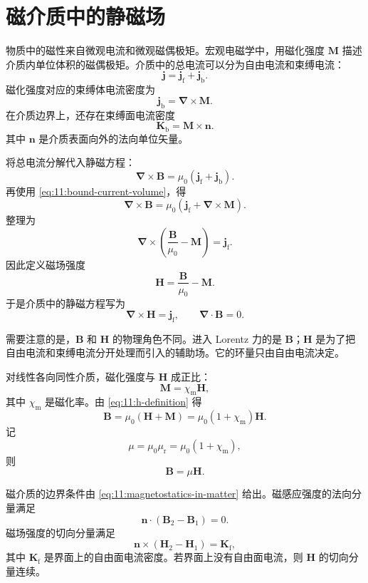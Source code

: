 \section{磁介质中的静磁场}

物质中的磁性来自微观电流和微观磁偶极矩。宏观电磁学中，用磁化强度 $\bm{M}$ 描述介质内单位体积的磁偶极矩。介质中的总电流可以分为自由电流和束缚电流：
\[
\bm{j}
=
\bm{j}_{\mathrm{f}}
+
\bm{j}_{\mathrm{b}}.
\]
磁化强度对应的束缚体电流密度为
\begin{equation}
	\bm{j}_{\mathrm{b}}
	=
	\bm{\nabla}\times\bm{M}.
	\label{eq:11:bound-current-volume}
\end{equation}
在介质边界上，还存在束缚面电流密度
\begin{equation}
	\bm{K}_{\mathrm{b}}
	=
	\bm{M}\times\bm{n}.
	\label{eq:11:bound-current-surface}
\end{equation}
其中 $\bm{n}$ 是介质表面向外的法向单位矢量。

将总电流分解代入静磁方程：
\[
\bm{\nabla}\times\bm{B}
=
\mu_{0}
(\bm{j}_{\mathrm{f}}+\bm{j}_{\mathrm{b}}).
\]
再使用 \eqref{eq:11:bound-current-volume}，得
\[
\bm{\nabla}\times\bm{B}
=
\mu_{0}
(\bm{j}_{\mathrm{f}}+\bm{\nabla}\times\bm{M}).
\]
整理为
\[
\bm{\nabla}\times
\left(
\frac{\bm{B}}{\mu_{0}}-\bm{M}
\right)
=
\bm{j}_{\mathrm{f}}.
\]
因此定义磁场强度
\begin{equation}
	\bm{H}
	=
	\frac{\bm{B}}{\mu_{0}}
	-
	\bm{M}.
	\label{eq:11:h-definition}
\end{equation}
于是介质中的静磁方程写为
\begin{equation}
	\bm{\nabla}\times\bm{H}
	=
	\bm{j}_{\mathrm{f}},
	\qquad
	\bm{\nabla}\cdot\bm{B}=0.
	\label{eq:11:magnetostatics-in-matter}
\end{equation}

需要注意的是，$\bm{B}$ 和 $\bm{H}$ 的物理角色不同。进入 Lorentz 力的是 $\bm{B}$；$\bm{H}$ 是为了把自由电流和束缚电流分开处理而引入的辅助场。它的环量只由自由电流决定。

对线性各向同性介质，磁化强度与 $\bm{H}$ 成正比：
\[
\bm{M}
=
\chi_{\mathrm{m}}\bm{H},
\]
其中 $\chi_{\mathrm{m}}$ 是磁化率。由 \eqref{eq:11:h-definition} 得
\[
\bm{B}
=
\mu_{0}(\bm{H}+\bm{M})
=
\mu_{0}(1+\chi_{\mathrm{m}})\bm{H}.
\]
记
\[
\mu
=
\mu_{0}\mu_{\mathrm{r}}
=
\mu_{0}(1+\chi_{\mathrm{m}}),
\]
则
\begin{equation}
	\bm{B}
	=
	\mu\bm{H}.
	\label{eq:11:linear-magnetic-medium}
\end{equation}

磁介质的边界条件由 \eqref{eq:11:magnetostatics-in-matter} 给出。磁感应强度的法向分量满足
\[
\bm{n}\cdot(\bm{B}_{2}-\bm{B}_{1})=0.
\]
磁场强度的切向分量满足
\[
\bm{n}\times(\bm{H}_{2}-\bm{H}_{1})
=
\bm{K}_{\mathrm{f}},
\]
其中 $\bm{K}_{\mathrm{f}}$ 是界面上的自由面电流密度。若界面上没有自由面电流，则 $\bm{H}$ 的切向分量连续。

